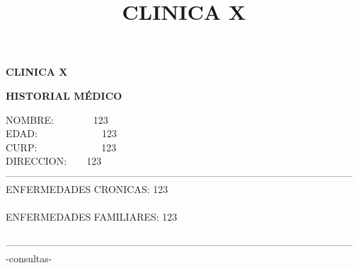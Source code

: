 \documentclass[10pt,a4paper]{letter}
\title{\bf CLINICA X}
\begin{document}
\begin{center}
{\scshape\LARGE \bf CLINICA X\par}
{\bf HISTORIAL MÉDICO\\}
\end{center}
NOMBRE:\ \ \ \ \ \ \ \ 123\\
EDAD:\ \ \ \ \ \ \ \ \ \ \ \ \ 123\\
CURP:\ \ \ \ \ \ \ \ \ \ \ \ \ 123 \\
DIRECCION:\ \ \ \ 123\\
--------------------------------------------------------------------------------------------------------- \\
ENFERMEDADES CRONICAS: 123\\ \\
ENFERMEDADES FAMILIARES: 123 \\ \\
--------------------------------------------------------------------------------------------------------- \\-consultas-
\end{document}
